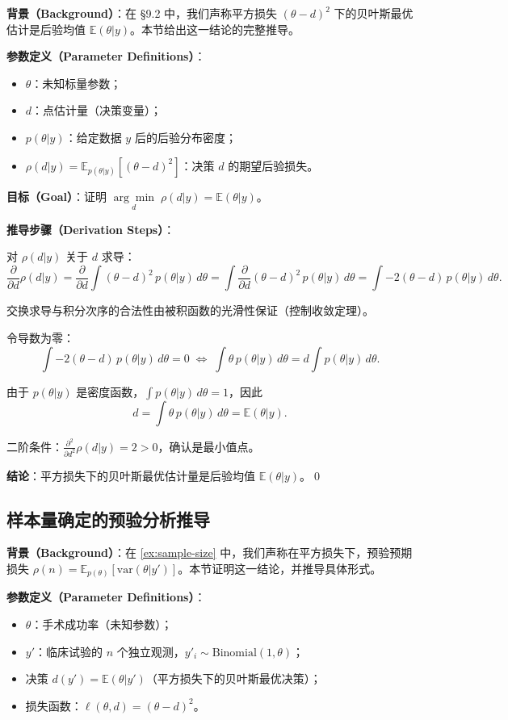 \textbf{背景（Background）}：在 \S 9.2 中，我们声称平方损失 $(\theta - d)^2$ 下的贝叶斯最优估计是后验均值 $\mathbb{E}(\theta | y)$。本节给出这一结论的完整推导。

\textbf{参数定义（Parameter Definitions）}：
\begin{itemize}
  \item $\theta$：未知标量参数；
  \item $d$：点估计量（决策变量）；
  \item $p(\theta | y)$：给定数据 $y$ 后的后验分布密度；
  \item $\rho(d | y) = \mathbb{E}_{p(\theta|y)}[(\theta - d)^2]$：决策 $d$ 的期望后验损失。
\end{itemize}

\textbf{目标（Goal）}：证明 $\underset{d}{\arg\min} \; \rho(d | y) = \mathbb{E}(\theta | y)$。

\textbf{推导步骤（Derivation Steps）}：

对 $\rho(d | y)$ 关于 $d$ 求导：
\[
\frac{\partial}{\partial d} \rho(d | y)
= \frac{\partial}{\partial d} \int (\theta - d)^2 \, p(\theta | y) \, d\theta
= \int \frac{\partial}{\partial d} (\theta - d)^2 \, p(\theta | y) \, d\theta
= \int -2(\theta - d) \, p(\theta | y) \, d\theta.
\]

交换求导与积分次序的合法性由被积函数的光滑性保证（控制收敛定理）。

令导数为零：
\[
\int -2(\theta - d) \, p(\theta | y) \, d\theta = 0
\;\Longleftrightarrow\;
\int \theta \, p(\theta | y) \, d\theta = d \int p(\theta | y) \, d\theta.
\]

由于 $p(\theta | y)$ 是密度函数，$\int p(\theta | y) \, d\theta = 1$，因此
\[
d = \int \theta \, p(\theta | y) \, d\theta = \mathbb{E}(\theta | y).
\]

二阶条件：$\frac{\partial^2}{\partial d^2} \rho(d | y) = 2 > 0$，确认是最小值点。

\textbf{结论}：平方损失下的贝叶斯最优估计量是后验均值 $\mathbb{E}(\theta | y)$。\qed

\subsection{样本量确定的预验分析推导}\label{sec:derivation-sample-size}

\textbf{背景（Background）}：在 \cref{ex:sample-size} 中，我们声称在平方损失下，预验预期损失 $\rho(n) = \mathbb{E}_{p(\theta)}[\text{var}(\theta | y')]$。本节证明这一结论，并推导具体形式。

\textbf{参数定义（Parameter Definitions）}：
\begin{itemize}
  \item $\theta$：手术成功率（未知参数）；
  \item $y'$：临床试验的 $n$ 个独立观测，$y'_i \sim \text{Binomial}(1, \theta)$；
  \item 决策 $d(y') = \mathbb{E}(\theta | y')$（平方损失下的贝叶斯最优决策）；
  \item 损失函数：$\ell(\theta, d) = (\theta - d)^2$。
\end{itemize}

